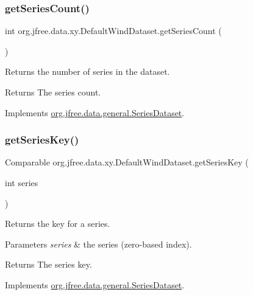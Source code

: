 \subsubsection{\texorpdfstring{get\+Series\+Count()}{getSeriesCount()}}
{\footnotesize\ttfamily int org.\+jfree.\+data.\+xy.\+Default\+Wind\+Dataset.\+get\+Series\+Count (\begin{DoxyParamCaption}{ }\end{DoxyParamCaption})}

Returns the number of series in the dataset.

\begin{DoxyReturn}{Returns}
The series count. 
\end{DoxyReturn}


Implements \mbox{\hyperlink{interfaceorg_1_1jfree_1_1data_1_1general_1_1_series_dataset_a84fe822f5918f941d9de1ed1b73c9f58}{org.\+jfree.\+data.\+general.\+Series\+Dataset}}.

\mbox{\label{classorg_1_1jfree_1_1data_1_1xy_1_1_default_wind_dataset_ac48b53bd5cb10baaad8e0ab89aa4f6ef}} 
\subsubsection{\texorpdfstring{get\+Series\+Key()}{getSeriesKey()}}
{\footnotesize\ttfamily Comparable org.\+jfree.\+data.\+xy.\+Default\+Wind\+Dataset.\+get\+Series\+Key (\begin{DoxyParamCaption}\item[{int}]{series }\end{DoxyParamCaption})}

Returns the key for a series.


\begin{DoxyParams}{Parameters}
{\em series} & the series (zero-\/based index).\\
\hline
\end{DoxyParams}
\begin{DoxyReturn}{Returns}
The series key. 
\end{DoxyReturn}


Implements \mbox{\hyperlink{interfaceorg_1_1jfree_1_1data_1_1general_1_1_series_dataset_a60488892b2314a05a012999e26a74178}{org.\+jfree.\+data.\+general.\+Series\+Dataset}}.

